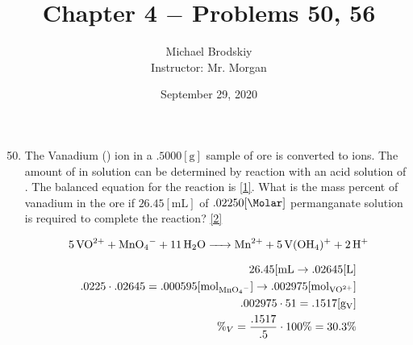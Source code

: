 \documentclass[12pt]{article}
\title{Chapter 4 $-$ Problems 50, 56}
\date{September 29, 2020}
\author{Michael Brodskiy\\ \small Instructor: Mr. Morgan}
\begin{document}
\maketitle

\begin{enumerate}

    \setcounter{enumi}{49}
  \item The Vanadium () ion in a $.5000[\si{\gram}]$ sample of ore is converted to  ions. The amount of  in solution can be determined by reaction with an acid solution of . The balanced equation for the reaction is \eqref{1}. What is the mass percent of vanadium in the ore if $26.45[\si{\milli\liter}]$ of $.02250[\si{\Molar}]$ permanganate solution is required to complete the reaction? \eqref{2}

    \begin{equation}
      \ce{5VO^{2+} + MnO4^- + 11H2O -> Mn^{2+} + 5V(OH4)^+ + 2H^+}
      \label{1}
    \end{equation}

    \begin{equation}
      \begin{split}
        26.45[\si{\milli\liter}\rightarrow .02645[\si{\liter}] \\
          .0225\cdot.02645=.000595[\si{\mole}_{\ce{MnO4^-}}]\rightarrow .002975[\si{\mole}_{\ce{VO^{2+}}}] \\
          .002975\cdot51=.1517[\si{\gram}_{\ce{V}}]\\
          \%_V=\frac{.1517}{.5}\cdot100\%=30.3\%\\
      \end{split}
      \label{2}
    \end{equation}

\end{enumerate}
\end{document}
